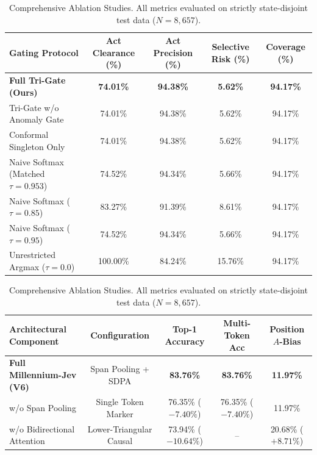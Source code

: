 \documentclass[11pt,a4paper]{article}
\begin{document}
\begin{table}[t]
\centering
\small
\begin{subtable}[t]{\textwidth}
\centering
\begin{tabular}{lcccc}
\toprule
\textbf{Gating Protocol} & \textbf{Act Clearance (\%)} & \textbf{Act Precision (\%)} & \textbf{Selective Risk (\%)} & \textbf{Coverage (\%)} \\
\midrule
\textbf{Full Tri-Gate (Ours)} & \textbf{74.01\%} & \textbf{94.38\%} & \textbf{5.62\%} & \textbf{94.17\%} \\
Tri-Gate w/o Anomaly Gate & 74.01\% & 94.38\% & 5.62\% & 94.17\% \\
Conformal Singleton Only & 74.01\% & 94.38\% & 5.62\% & 94.17\% \\
Naive Softmax (Matched $\tau=0.953$) & 74.52\% & 94.34\% & 5.66\% & 94.17\% \\
Naive Softmax ($\tau=0.85$) & 83.27\% & 91.39\% & 8.61\% & 94.17\% \\
Naive Softmax ($\tau=0.95$) & 74.52\% & 94.34\% & 5.66\% & 94.17\% \\
Unrestricted Argmax ($\tau=0.0$) & 100.00\% & 84.24\% & 15.76\% & 94.17\% \\
\bottomrule
\end{tabular}
\caption{Ablation 2A: Gating Policy \& Trustworthy Decision Making under Conformal Boundaries.}
\label{tab:ablation_gating}
\end{subtable}

\vspace{2mm}
\begin{subtable}[t]{\textwidth}
\centering
\begin{tabular}{lcccc}
\toprule
\textbf{Architectural Component} & \textbf{Configuration} & \textbf{Top-1 Accuracy} & \textbf{Multi-Token Acc} & \textbf{Position $A$-Bias} \\
\midrule
\textbf{Full Millennium-Jev (V6)} & Span Pooling + SDPA & \textbf{83.76\%} & \textbf{83.76\%} & \textbf{11.97\%} \\
w/o Span Pooling & Single Token Marker & 76.35\% ($-7.40\%$) & 76.35\% ($-7.40\%$) & 11.97\% \\
w/o Bidirectional Attention & Lower-Triangular Causal & 73.94\% ($-10.64\%$) & -- & 20.68\% ($+8.71\%$) \\
\bottomrule
\end{tabular}
\caption{Ablation 2B: Architectural Component Breakdown on Disjoint Representation Learning.}
\label{tab:ablation_architecture}
\end{subtable}
\caption{Comprehensive Ablation Studies. All metrics evaluated on strictly state-disjoint test data ($N=8,657$).}
\label{tab:main_ablation}
\end{table}
\end{document}
